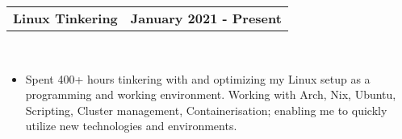 \documentclass[letterpaper,oneside,10.8pt]{article}
\makeatletter
\newcommand{\resumeItem}[2]{
  \item\small{
    \textbf{#1}{: #2 \vspace{-2pt}}
  }
}
\newcommand{\resumeItemWithoutTitle}[1]{
  \item\small{
    {\vspace{-2pt}}
  }
}
\newcommand{\resumeSubItem}[2]{\resumeItem{#1}{#2}\vspace{-4pt}}
\newcommand{\resumeItemListStart}{\begin{itemize}}
\newcommand{\resumeItemListEnd}{\end{itemize}\vspace{-5pt}}
\newcommand{\titleAndDate}[2]{
  \small{
  \vspace{-1pt}
    \begin{tabular*}{1\textwidth}{l@{\extracolsep{\fill}}r}
      \textbf{#1} & \textbf{#2} \\
    \end{tabular*}\vspace{-1pt} \\
  }
}
\newcommand{\normalText}[1]{
  \small{
    {#1}
  }\vspace{-1pt}\\
}
\makeatother
\begin{document}

\vspace{4pt}

\titleAndDate{Linux Tinkering}{January 2021 - Present}
\begin{itemize}[leftmargin=10pt]
    \item\normalText{Spent 400+ hours tinkering with and optimizing my Linux setup as a programming and working environment. Working with Arch, Nix, Ubuntu, Scripting, Cluster management, Containerisation; enabling me to quickly utilize new technologies and environments. }
\end{itemize}


% 

\end{document}
